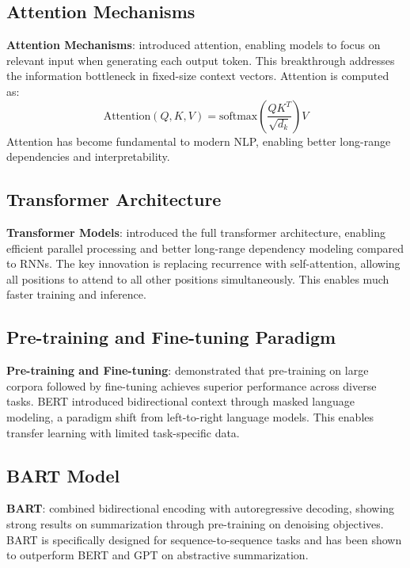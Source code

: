 \documentclass[12pt,a4paper,oneside]{report}
\begin{document}
\subsection{Attention Mechanisms}
\textbf{Attention Mechanisms}: \cite{bahdanau2015neural} introduced attention, enabling models to focus on relevant input when generating each output token. This breakthrough addresses the information bottleneck in fixed-size context vectors. Attention is computed as:
\begin{equation}
\text{Attention}(Q, K, V) = \text{softmax}\left(\frac{QK^T}{\sqrt{d_k}}\right)V
\end{equation}
Attention has become fundamental to modern NLP, enabling better long-range dependencies and interpretability.

\subsection{Transformer Architecture}
\textbf{Transformer Models}: \cite{vaswani2017attention} introduced the full transformer architecture, enabling efficient parallel processing and better long-range dependency modeling compared to RNNs. The key innovation is replacing recurrence with self-attention, allowing all positions to attend to all other positions simultaneously. This enables much faster training and inference.

\subsection{Pre-training and Fine-tuning Paradigm}
\textbf{Pre-training and Fine-tuning}: \cite{devlin2019bert} demonstrated that pre-training on large corpora followed by fine-tuning achieves superior performance across diverse tasks. BERT introduced bidirectional context through masked language modeling, a paradigm shift from left-to-right language models. This enables transfer learning with limited task-specific data.

\subsection{BART Model}
\textbf{BART}: \cite{lewis2019bart} combined bidirectional encoding with autoregressive decoding, showing strong results on summarization through pre-training on denoising objectives. BART is specifically designed for sequence-to-sequence tasks and has been shown to outperform BERT and GPT on abstractive summarization.
\end{document}
